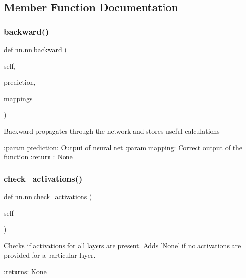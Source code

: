\subsection{Member Function Documentation}
\mbox{\label{classnn_1_1nn_a53a7beb698fe127ebb1f636fccbaa126}} 
\subsubsection{\texorpdfstring{backward()}{backward()}}
{\footnotesize\ttfamily def nn.\+nn.\+backward (\begin{DoxyParamCaption}\item[{}]{self,  }\item[{}]{prediction,  }\item[{}]{mappings }\end{DoxyParamCaption})}

\begin{DoxyVerb}Backward propagates through the network and stores useful calculations

:param prediction: Output of neural net
:param mapping: Correct output of the function
:return : None
\end{DoxyVerb}
 \mbox{\label{classnn_1_1nn_a15ee3f3e18ebae83c904b3441ece897d}} 
\subsubsection{\texorpdfstring{check\+\_\+activations()}{check\_activations()}}
{\footnotesize\ttfamily def nn.\+nn.\+check\+\_\+activations (\begin{DoxyParamCaption}\item[{}]{self }\end{DoxyParamCaption})}

\begin{DoxyVerb}Checks if activations for all layers are present. Adds 'None' if no activations are provided for a particular layer.

:returns: None
\end{DoxyVerb}
 \mbox{\label{classnn_1_1nn_a822299322a0b513f8985e61096be45bc}} 
